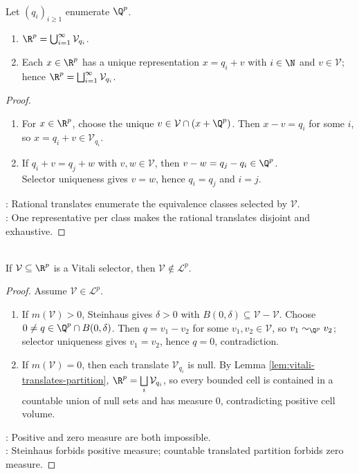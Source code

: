 \begin{lemma} \label{lem:vitali-translates-partition} \\
Let $(q_i)_{i\geq1}$ enumerate $\Q^p$.
\begin{enumerate}[label=(\roman*)]
\setlength{\itemsep}{0pt}
\item $\R^p=\bigcup_{i=1}^{\infty}\mathcal{V}_{q_i}$.
\item Each $x\in\R^p$ has a unique representation $x=q_i+v$ with $i\in\N$ and $v\in\mathcal{V}$; hence $\R^p=\bigsqcup_{i=1}^{\infty}\mathcal{V}_{q_i}$.
\end{enumerate}
\begin{proof}
\begin{enumerate}[label=(\roman*)]
\setlength{\itemsep}{0pt}
\item For $x\in\R^p$, choose the unique $v\in\mathcal{V}\cap(x+\Q^p)$. Then $x-v=q_i$ for some $i$, so $x=q_i+v\in\mathcal{V}_{q_i}$.
\item If $q_i+v=q_j+w$ with $v,w\in\mathcal{V}$, then $v-w=q_j-q_i\in\Q^p$.\\
Selector uniqueness gives $v=w$, hence $q_i=q_j$ and $i=j$.
\end{enumerate}
: Rational translates enumerate the equivalence classes selected by $\mathcal{V}$.\\
: One representative per class makes the rational translates disjoint and exhaustive.
\end{proof}
\end{lemma}

\begin{theorem} \label{thm:vitali-selector-nonmeasurable} \\
If $\mathcal{V}\subseteq\R^p$ is a Vitali selector, then $\mathcal{V}\notin\mathcal{L}^p$.
\begin{proof}
Assume $\mathcal{V}\in\mathcal{L}^p$.
\begin{enumerate}[label=(\roman*)]
\setlength{\itemsep}{0pt}
\item If $m(\mathcal{V})>0$, Steinhaus gives $\delta>0$ with $B(0,\delta)\subseteq\mathcal{V}-\mathcal{V}$. Choose $0\neq q\in\Q^p\cap B(0,\delta)$. Then $q=v_1-v_2$ for some $v_1,v_2\in\mathcal{V}$, so $v_1\sim_{\Q^p}v_2$; selector uniqueness gives $v_1=v_2$, hence $q=0$, contradiction.
\item If $m(\mathcal{V})=0$, then each translate $\mathcal{V}_{q_i}$ is null. By Lemma \ref{lem:vitali-translates-partition}, $\R^p=\bigsqcup\limits_i\mathcal{V}_{q_i}$, so every bounded cell is contained in a countable union of null sets and has measure $0$, contradicting positive cell volume.
\end{enumerate}
: Positive and zero measure are both impossible.\\
: Steinhaus forbids positive measure; countable translated partition forbids zero measure.
\end{proof}
\end{theorem}

